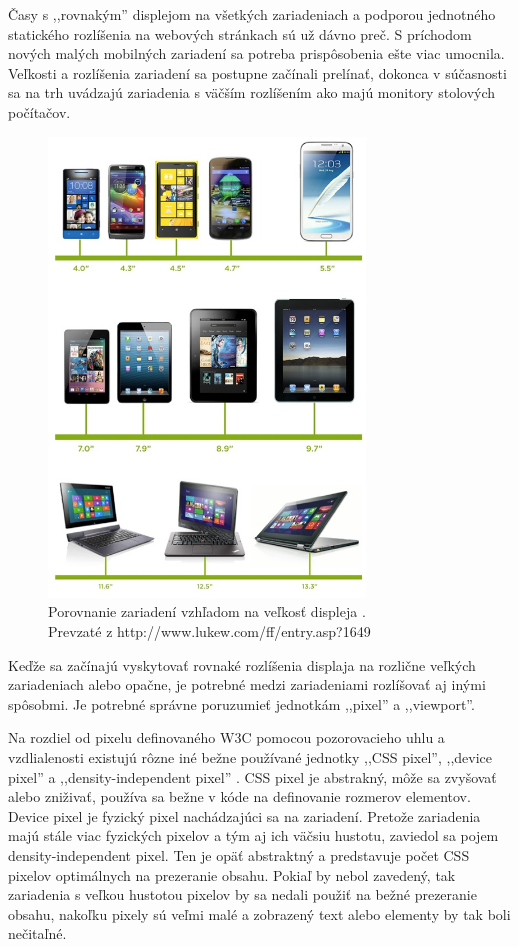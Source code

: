 Časy s ,,rovnakým'' displejom na všetkých zariadeniach a podporou jednotného statického rozlíšenia na webových stránkach sú už dávno preč. S príchodom nových malých mobilných zariadení sa potreba prispôsobenia ešte viac umocnila. Veľkosti a rozlíšenia zariadení sa postupne začínali prelínať, dokonca v súčasnosti sa na trh uvádzajú zariadenia s väčším rozlíšením ako majú monitory stolových počítačov.


\begin{figure}[H]
	\centering
	\includegraphics[width=0.75\textwidth]{img/tnav-devices.jpg}
	\caption[Porovnanie zariadení vzhľadom na veľkosť displeja]{
		Porovnanie zariadení vzhľadom na veľkosť displeja \cite{navigation}.\\
		Prevzaté z http://www.lukew.com/ff/entry.asp?1649}
	\label{fig: tnavmobile}
\end{figure}

Keďže sa začínajú vyskytovať rovnaké rozlíšenia displaja na rozlične veľkých zariadeniach alebo opačne, je potrebné medzi zariadeniami rozlíšovať aj inými spôsobmi. Je potrebné správne poruzumieť jednotkám ,,pixel'' a ,,viewport''.

Na rozdiel od pixelu definovaného W3C pomocou pozorovacieho uhlu a vzdlialenosti \cite{w3cpixel} existujú rôzne iné bežne používané jednotky ,,CSS pixel'', ,,device pixel'' a ,,density-independent pixel'' \cite{pixelnotpixel}. CSS pixel je abstrakný, môže sa zvyšovať alebo zniživať, používa sa bežne v kóde na definovanie rozmerov elementov.  Device pixel je fyzický pixel nachádzajúci sa na zariadení. Pretože zariadenia majú stále viac fyzických pixelov a tým aj ich väčsiu hustotu, zaviedol sa pojem density-independent pixel. Ten je opäť abstraktný a predstavuje počet CSS pixelov optimálnych na prezeranie obsahu. Pokiaľ by nebol zavedený, tak zariadenia s veľkou hustotou pixelov by sa nedali použiť na bežné prezeranie obsahu, nakoľku pixely sú veľmi malé a zobrazený text alebo elementy by tak boli nečitaľné.

